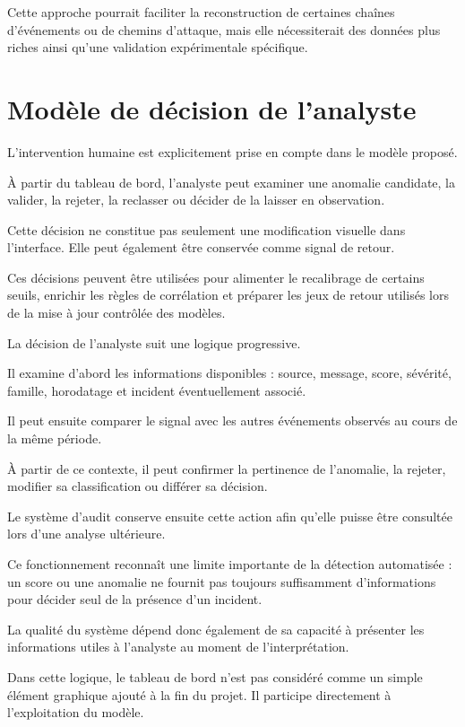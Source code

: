 Cette approche pourrait faciliter la reconstruction de certaines chaînes d'événements ou de chemins d'attaque, mais elle nécessiterait des données plus riches ainsi qu'une validation expérimentale spécifique.

\section{Modèle de décision de l'analyste}

L'intervention humaine est explicitement prise en compte dans le modèle proposé.

À partir du tableau de bord, l'analyste peut examiner une anomalie candidate, la valider, la rejeter, la reclasser ou décider de la laisser en observation.

Cette décision ne constitue pas seulement une modification visuelle dans l'interface. Elle peut également être conservée comme signal de retour.

Ces décisions peuvent être utilisées pour alimenter le recalibrage de certains seuils, enrichir les règles de corrélation et préparer les jeux de retour utilisés lors de la mise à jour contrôlée des modèles.

La décision de l'analyste suit une logique progressive.

Il examine d'abord les informations disponibles : source, message, score, sévérité, famille, horodatage et incident éventuellement associé.

Il peut ensuite comparer le signal avec les autres événements observés au cours de la même période.

À partir de ce contexte, il peut confirmer la pertinence de l'anomalie, la rejeter, modifier sa classification ou différer sa décision.

Le système d'audit conserve ensuite cette action afin qu'elle puisse être consultée lors d'une analyse ultérieure.

Ce fonctionnement reconnaît une limite importante de la détection automatisée : un score ou une anomalie ne fournit pas toujours suffisamment d'informations pour décider seul de la présence d'un incident.

La qualité du système dépend donc également de sa capacité à présenter les informations utiles à l'analyste au moment de l'interprétation.

Dans cette logique, le tableau de bord n'est pas considéré comme un simple élément graphique ajouté à la fin du projet. Il participe directement à l'exploitation du modèle.

